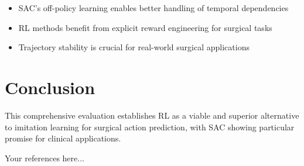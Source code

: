 \documentclass[conference]{IEEEtran}
\begin{document}
\begin{itemize}
\item SAC's off-policy learning enables better handling of temporal dependencies
\item RL methods benefit from explicit reward engineering for surgical tasks
\item Trajectory stability is crucial for real-world surgical applications
\end{itemize}

\section{Conclusion}
This comprehensive evaluation establishes RL as a viable and superior alternative to imitation learning for surgical action prediction, with SAC showing particular promise for clinical applications.

\begin{thebibliography}{1}
 Your references here...
\end{thebibliography}
\end{document}
